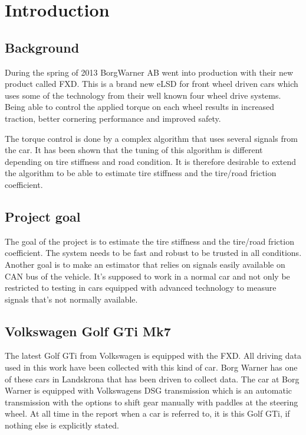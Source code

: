 \chapter{Introduction}

\section{Background}
During the spring of 2013 BorgWarner AB went into production with their new product called FXD. This is a brand new eLSD for front wheel driven cars which uses some of the technology from their well known four wheel drive systems. Being able to control the applied torque on each wheel results in increased traction, better cornering performance and improved safety.

The torque control is done by a complex algorithm that uses several signals from the car. It has been shown that the tuning of this algorithm is different depending on tire stiffness and road condition. It is therefore desirable to extend the algorithm to be able to estimate tire stiffness and the tire/road friction coefficient.

\section{Project goal}
The goal of the project is to estimate the tire stiffness and the tire/road friction coefficient. The system needs to be fast and robust to be trusted in all conditions. Another goal is to make an estimator that relies on signals easily available on CAN bus of the vehicle. It's supposed to work in a normal car and not only be restricted to testing in cars equipped with advanced technology to measure signals that's not normally available. 

\section{Volkswagen Golf GTi Mk7}
The latest Golf GTi from Volkswagen is equipped with the FXD. All driving data used in this work have been collected with this kind of car. Borg Warner has one of these cars in Landskrona that has been driven to collect data. The car at Borg Warner is equipped with Volkswagens DSG transmission which is an automatic transmission with the options to shift gear manually with paddles at the steering wheel. At all time in the report when a car is referred to, it is this Golf GTi, if nothing else is explicitly stated.

